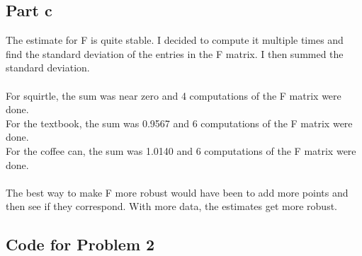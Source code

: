 \documentclass[11pt,psfig]{article}
\begin{document}
\newpage

\subsection*{Part c}

The estimate for F is quite stable. I decided to compute it multiple times and find the standard deviation of the entries in the F matrix. I then summed the standard deviation. \\
\\
For squirtle, the sum was near zero and 4 computations of the F matrix were done.\\
For the textbook, the sum was 0.9567 and 6 computations of the F matrix were done.\\
For the coffee can, the sum was 1.0140 and 6 computations of the F matrix were done. \\
\\
The best way to make F more robust would have been to add more points and then see if they correspond. With more data, the estimates get more robust. 

\subsection*{Code for Problem 2}


\end{document}
